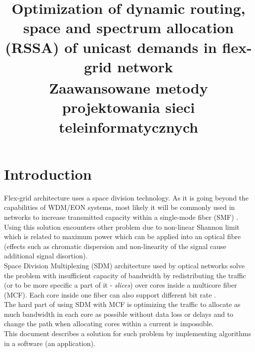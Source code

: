 \documentclass[conference]{IEEEtran}
\begin{document}
\title{Optimization of dynamic routing, space and spectrum allocation
(RSSA) of unicast demands in flex-grid network\\
{\footnotesize \textsuperscript{} Zaawansowane metody projektowania sieci teleinformatycznych}
}

\author{
\and
{}
}

\maketitle

\section{Introduction}
Flex-grid architecture uses a space division technology. As it is going beyond the capabilities of WDM/EON systems, most likely it will be commonly used in networks to increase transmitted capacity within a single-mode fiber (SMF) \cite{sdm-walko}. Using this solution encounters other problem due to non-linear Shannon limit which is related to maximum power which can be applied into an optical fibre (effects such as chromatic dispersion and non-linearity of the signal cause additional signal disortion)\cite{shannon}.
\\
Space Division Multiplexing (SDM) architecture used by optical networks solve the problem with insufficient capacity of bandwidth by redistributing the traffic (or to be more specific a part of it - \textit{slices}) over cores inside a multicore fiber (MCF). Each core inside one fiber can also support different bit rate \cite{flex-intro}.
\\
The hard part of using SDM with MCF is optimizing the traffic to allocate as much bandwidth in each core as possible without data loss or delays and to change the path when allocating cores within a current is impossible.
\\
This document describes a solution for such problem by implementing algorithms in a software (an application).
\\
\end{document}
